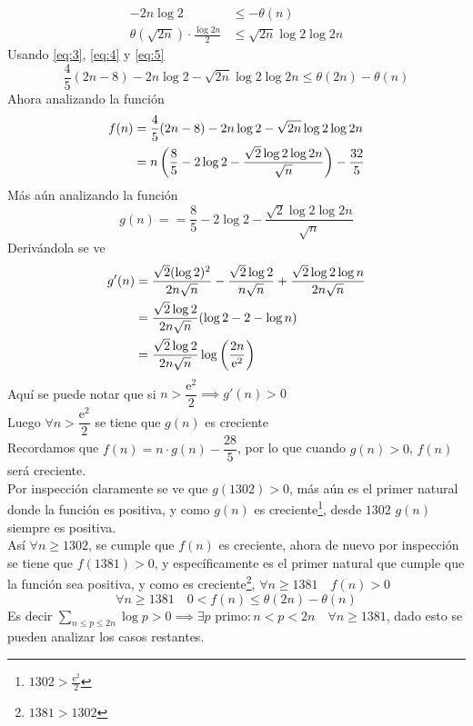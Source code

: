 \begin{sol}
\begin{align}
		-2n\log2                               & \leq-\theta(n)\label{eq:4}           \\
		\theta(\sqrt{2n})\cdot\frac{\log2n}{2} & \leq\sqrt{2n}\log2\log2n\label{eq:5}
	\end{align}
	Usando \eqref{eq:3}, \eqref{eq:4} y \eqref{eq:5}
	\begin{equation*}
		\frac45(2n-8)-2n\log2-\sqrt{2n}\log2\log2n\leq\theta(2n)-\theta(n)
	\end{equation*}
	Ahora analizando la función
	\begin{align*}
		f(n) & =\frac45(2n-8)-2n\log2-\sqrt{2n}\log2\log2n                            \\
		     & =n\left(\frac85-2\log2-\frac{\sqrt2\log2\log2n}{\sqrt{n}}\right)-\frac{32}5
	\end{align*}
	Más aún analizando la función
	\[g(n)==\frac85-2\log2-\frac{\sqrt2\log2\log2n}{\sqrt{n}}\]
	Derivándola se ve
	\begin{align*}
		g'(n) & =\frac{\sqrt2(\log2)^2}{2n\sqrt{n}}-\frac{\sqrt2\log2}{n\sqrt{n}}+\frac{\sqrt2\log2\log n}{2n\sqrt{n}} \\
		      & =\frac{\sqrt2\log2}{2n\sqrt{n}}(\log2-2-\log{n})                                                       \\
		      & =\frac{\sqrt2\log2}{2n\sqrt{n}}\log\left(\frac{2n}{\mathrm{e}^2}\right)
	\end{align*}
	Aquí se puede notar que si $n>\dfrac{\mathrm{e}^2}2\implies g'(n)>0$\\
	Luego $\forall n>\dfrac{\mathrm{e}^2}2$ se tiene que $g(n)$ es creciente\\
	Recordamos que $f(n)=n\cdot g(n)-\dfrac{28}5$, por lo que cuando $g(n)>0$, $f(n)$ será creciente.\\
	Por inspección claramente se ve que $g(1302)>0$, más aún es el primer natural donde la función es positiva, y como $g(n)$ es creciente\footnote{$1302>\frac{\mathrm{e}^2}2$}, desde $1302$ $g(n)$ siempre es positiva.\\
	Así $\forall n\geq1302$, se cumple que $f(n)$ es creciente, ahora de nuevo por inspección se tiene que $f(1381)>0$, y específicamente es el primer natural que cumple que la función sea positiva, y como es creciente\footnote{$1381>1302$}, $\forall n\geq1381\quad f(n)>0$\\
	\[\forall n\geq1381\quad0<f(n)\leq\theta(2n)-\theta(n)\]
	Es decir $\displaystyle\sum_{n\leq p\leq 2n}\log{p}>0\implies\exists p\text{ primo}:n<p<2n\quad\forall n\geq1381$, dado esto se pueden analizar los casos restantes.

\end{sol}
